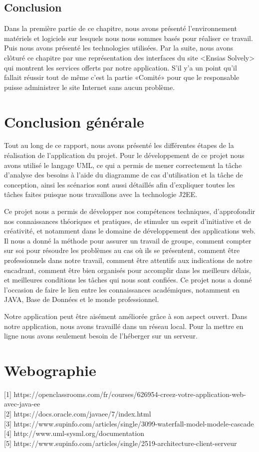 \documentclass[11.5pt]{report}
\begin{document}
\section{Conclusion}
Dans la première partie de ce chapitre, nous avons présenté l’environnement matériels et logiciels sur lesquels nous nous sommes basés pour réaliser ce travail. Puis nous avons  présenté les technologies utilisées. Par la suite, nous avons clôturé ce chapitre par une représentation des interfaces du site <Ensias Solvely> qui montrent les services offerts par notre application. S’il y’a un point qu’il fallait réussir tout de même c’est la partie «Comité» pour que le responsable puisse administrer le site Internet sans aucun problème.
	
\chapter*{Conclusion générale}
Tout au long de ce rapport, nous avons présenté les différentes étapes de la réalisation de l’application du projet. Pour le développement de ce projet nous avons 
utilisé le langage UML, ce qui a permis de mener correctement la tâche d’analyse des besoins à l’aide du diagramme de cas d’utilisation et la tâche de conception, ainsi les scénarios sont aussi détaillés afin d’expliquer toutes les tâches faites puisque nous travaillons avec la technologie J2EE.

Ce projet nous a permis de développer nos compétences techniques, d’approfondir nos connaissances théoriques et pratiques, de stimuler un esprit d’initiative et de créativité, et notamment dans le domaine de développement des applications web. Il nous a donné la méthode pour assurer un travail de groupe, comment compter sur soi pour résoudre les problèmes au cas où ils se présentent, comment être professionnels dans notre travail, comment être attentifs aux indications de notre encadrant, comment être bien organisés pour accomplir dans les meilleurs délais, et meilleures conditions les tâches qui nous sont confiées. Ce projet nous a donné l’occasion de faire le lien entre les connaissances académiques, notamment en JAVA, Base de Données et le monde professionnel.

Notre application peut être aisément améliorée grâce à son aspect ouvert. Dans notre application, nous avons travaillé dans un réseau local. Pour la mettre en ligne nous avons seulement besoin de l’héberger sur un serveur.
\chapter*{Webographie}
[1]   https://openclassrooms.com/fr/courses/626954-creez-votre-application-web-avec-java-ee\\

[2]     https://docs.oracle.com/javaee/7/index.html\\

[3]    https://www.supinfo.com/articles/single/3099-waterfall-model-modele-cascade \\

[4]   http://www.uml-sysml.org/documentation \\

[5]     https://www.supinfo.com/articles/single/2519-architecture-client-serveur \\  
\end{document}
